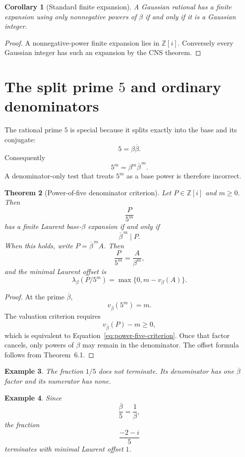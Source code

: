 \documentclass[11pt]{article}
\newtheorem{theorem}{Theorem}[section]
\newtheorem{corollary}[theorem]{Corollary}
\newtheorem{example}[theorem]{Example}
\theoremstyle{definition}
\newcommand{\Zi}{\mathbb{Z}[i]}
\begin{document}
\begin{corollary}[Standard finite expansion]
A Gaussian rational has a finite expansion using only nonnegative powers of $\beta$ if and only if it is a Gaussian integer.
\end{corollary}

\begin{proof}
A nonnegative-power finite expansion lies in $\Zi$.  Conversely every Gaussian integer has such an expansion by the CNS theorem.
\end{proof}

\section{The split prime $5$ and ordinary denominators}

The rational prime $5$ is special because it splits exactly into the base and its conjugate:
\[
5=\beta\overline\beta.
\]
Consequently
\[
5^m=\beta^m\overline\beta^{\,m}.
\]
A denominator-only test that treats $5^m$ as a base power is therefore incorrect.

\begin{theorem}[Power-of-five denominator criterion]
Let $P\in\Zi$ and $m\ge0$.  Then
\[
\frac{P}{5^m}
\]
has a finite Laurent base-$\beta$ expansion if and only if
\begin{equation}
\overline\beta^{\,m}\mid P.
\label{eq:power-five-criterion}
\end{equation}
When this holds, write $P=\overline\beta^{\,m}A$.  Then
\[
\frac{P}{5^m}=\frac{A}{\beta^m},
\]
and the minimal Laurent offset is
\[
\lambda_\beta(P/5^m)=\max\{0,m-v_\beta(A)\}.
\]
\end{theorem}

\begin{proof}
At the prime $\overline\beta$,
\[
v_{\overline\beta}(5^m)=m.
\]
The valuation criterion requires
\[
v_{\overline\beta}(P)-m\ge0,
\]
which is equivalent to Equation~\eqref{eq:power-five-criterion}.  Once that factor cancels, only powers of $\beta$ may remain in the denominator.  The offset formula follows from Theorem~6.1.
\end{proof}

\begin{example}
The fraction $1/5$ does not terminate.  Its denominator has one $\overline\beta$ factor and its numerator has none.
\end{example}

\begin{example}
Since
\[
\frac{\overline\beta}{5}=\frac1\beta,
\]
the fraction
\[
\frac{-2-i}{5}
\]
terminates with minimal Laurent offset $1$.
\end{example}
\end{document}
